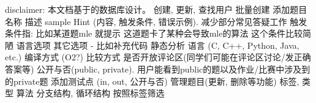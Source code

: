 \markdownRendererInterblockSeparator
{}disclaimer: 本文档基于的数据库设计。\markdownRendererInterblockSeparator
{}\markdownRendererInterblockSeparator
{}\markdownRendererInterblockSeparator
{}\markdownRendererInterblockSeparator
{}\markdownRendererUlBeginTight
\markdownRendererUlItem 创建, 更新, 查找用户\markdownRendererUlItemEnd 
\markdownRendererUlItem 批量创建\markdownRendererUlItemEnd 
\markdownRendererUlEndTight \markdownRendererInterblockSeparator
{}\markdownRendererInterblockSeparator
{}\markdownRendererUlBeginTight
\markdownRendererUlItem 添加题目\markdownRendererUlItemEnd 
\markdownRendererUlItem 名称\markdownRendererUlItemEnd 
\markdownRendererUlItem 描述\markdownRendererUlItemEnd 
\markdownRendererUlItem sample\markdownRendererUlItemEnd 
\markdownRendererUlItem Hint (内容, 触发条件, 错误示例). 减少部分常见答疑工作\markdownRendererInterblockSeparator
{}\markdownRendererUlBeginTight
\markdownRendererUlItem 触发条件指: 比如某道题mle 就提示 这道题卡了某种会导致mle的算法\markdownRendererUlItemEnd 
\markdownRendererUlItem 这个条件比较简陋\markdownRendererUlItemEnd 
\markdownRendererUlEndTight \markdownRendererUlItemEnd 
\markdownRendererUlItem 语言选项\markdownRendererInterblockSeparator
{}\markdownRendererUlBeginTight
\markdownRendererUlItem 其它选项 - 比如补充代码\markdownRendererUlItemEnd 
\markdownRendererUlItem 静态分析\markdownRendererUlItemEnd 
\markdownRendererUlItem 语言 (C, C++, Python, Java, etc.)\markdownRendererUlItemEnd 
\markdownRendererUlItem 编译方式 (O2?)\markdownRendererUlItemEnd 
\markdownRendererUlItem 比较方式\markdownRendererUlItemEnd 
\markdownRendererUlEndTight \markdownRendererUlItemEnd 
\markdownRendererUlItem 是否开放评论区(同学们可能在评论区讨论/发正确答案等)\markdownRendererUlItemEnd 
\markdownRendererUlItem 公开与否(public, private). 用户能看到public的题以及作业/比赛中涉及到的private题\markdownRendererUlItemEnd 
\markdownRendererUlItem 添加测试点 (in, out, 公开与否)\markdownRendererUlItemEnd 
\markdownRendererUlItem 管理题目(更新, 删除等功能)\markdownRendererUlItemEnd 
\markdownRendererUlItem 标签, 类型\markdownRendererUlItemEnd 
\markdownRendererUlItem 算法\markdownRendererUlItemEnd 
\markdownRendererUlItem 分支结构, 循环结构\markdownRendererUlItemEnd 
\markdownRendererUlItem 按照标签筛选\markdownRendererUlItemEnd 
\markdownRendererUlEndTight \markdownRendererInterblockSeparator
